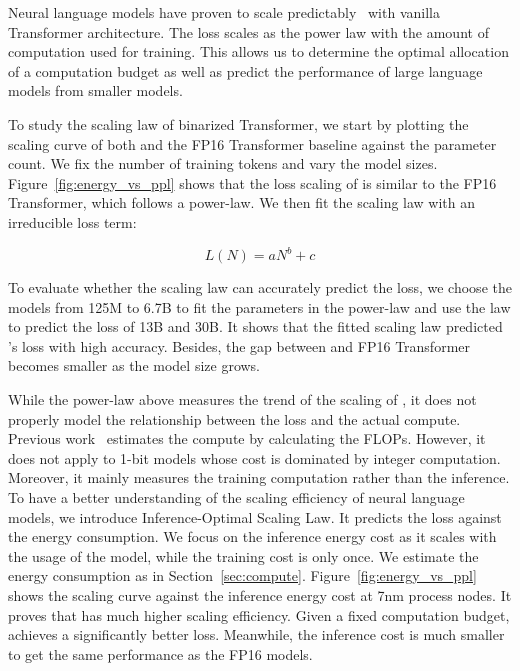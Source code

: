 Neural language models have proven to scale predictably~\cite{scalinglawlm} with vanilla Transformer architecture. The loss scales as the power law with the amount of computation used for training. This allows us to determine the optimal allocation of a computation budget as well as predict the performance of large language models from smaller models. 

To study the scaling law of binarized Transformer, we start by plotting the scaling curve of both \our{} and the FP16 Transformer baseline against the parameter count. We fix the number of training tokens and vary the model sizes. Figure~\ref{fig:energy_vs_ppl} shows that the loss scaling of \our{} is similar to the FP16 Transformer, which follows a power-law. We then fit the scaling law with an irreducible loss term:

\begin{equation}
    L(N)=aN^b+c
\end{equation}

To evaluate whether the scaling law can accurately predict the loss, we choose the models from 125M to 6.7B to fit the parameters in the power-law and use the law to predict the loss of 13B and 30B. It shows that the fitted scaling law predicted \our{}'s loss with high accuracy. Besides, the gap between \our{} and FP16 Transformer becomes smaller as the model size grows.

While the power-law above measures the trend of the scaling of \our{}, it does not properly model the relationship between the loss and the actual compute. Previous work~\cite{scalinglawlm,scalinglawar,chinchilla} estimates the compute by calculating the FLOPs. However, it does not apply to 1-bit models whose cost is dominated by integer computation. Moreover, it mainly measures the training computation rather than the inference. To have a better understanding of the scaling efficiency of neural language models, we introduce Inference-Optimal Scaling Law. It predicts the loss against the energy consumption. We focus on the inference energy cost as it scales with the usage of the model, while the training cost is only once. We estimate the energy consumption as in Section~\ref{sec:compute}. Figure~\ref{fig:energy_vs_ppl} shows the scaling curve against the inference energy cost at 7nm process nodes. It proves that \our{} has much higher scaling efficiency. Given a fixed computation budget, \our{} achieves a significantly better loss. Meanwhile, the inference cost is much smaller to get the same performance as the FP16 models.

